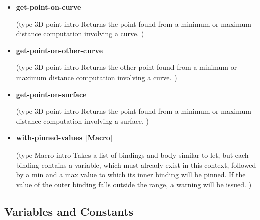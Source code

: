 \documentclass [11pt]{book}
\begin{document}
\begin{itemize}

\item {}
\label{prim:get-point-on-curve}
\textbf{get-point-on-curve}

(type 3D point intro
  Returns the point found from a minimum or maximum distance computation involving a curve.
)



\item {}
\label{prim:get-point-on-other-curve}
\textbf{get-point-on-other-curve}

(type 3D point intro
  Returns the other point found from a minimum or maximum distance computation involving a curve.
)



\item {}
\label{prim:get-point-on-surface}
\textbf{get-point-on-surface}

(type 3D point intro
  Returns the point found from a minimum or maximum distance computation involving a surface.
)



\item {}
\label{prim:with-pinned-values}
\textbf{with-pinned-values [Macro]}

(type Macro intro
  Takes a list of bindings and body similar to let, but each binding
contains a variable, which must already exist in this context, followed by a
min and a max value to which its inner binding will be pinned. If the
value of the outer binding falls outside the range, a warning will be
issued.
)



\end{itemize}



\subsection{Variables and Constants}

\label{subsec:variablesandconstants}
\end{document}
